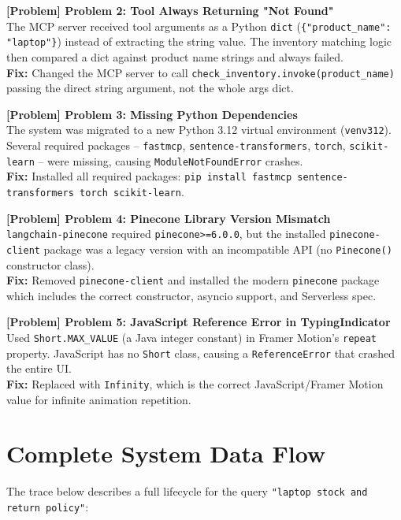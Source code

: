 \documentclass[12pt]{article}
\newcommand{\problembox}[2]{%
  \vspace{6pt}%
  \noindent\colorbox{lightbg}{\parbox{\dimexpr\linewidth-2\fboxsep}{%
    \textbf{\textcolor{accent}{[Problem]} #1}\\[4pt]%
    #2%
  }}\vspace{6pt}%
}
\begin{document}
\problembox{Problem 2: Tool Always Returning "Not Found"}{%
The MCP server received tool arguments as a Python \texttt{dict} (\texttt{\{"product\_name": "laptop"\}}) instead of extracting the string value. The inventory matching logic then compared a dict against product name strings and always failed. \\[4pt]
\textbf{Fix:} Changed the MCP server to call \texttt{check\_inventory.invoke(product\_name)} passing the direct string argument, not the whole args dict.%
}

\problembox{Problem 3: Missing Python Dependencies}{%
The system was migrated to a new Python 3.12 virtual environment (\texttt{venv312}). Several required packages -- \texttt{fastmcp}, \texttt{sentence-transformers}, \texttt{torch}, \texttt{scikit-learn} -- were missing, causing \texttt{ModuleNotFoundError} crashes. \\[4pt]
\textbf{Fix:} Installed all required packages:\vspace{2pt}\newline
\texttt{pip install fastmcp sentence-transformers torch scikit-learn}.%
}

\problembox{Problem 4: Pinecone Library Version Mismatch}{%
\texttt{langchain-pinecone} required \texttt{pinecone>=6.0.0}, but the installed \texttt{pinecone-client} package was a legacy version with an incompatible API (no \texttt{Pinecone()} constructor class). \\[4pt]
\textbf{Fix:} Removed \texttt{pinecone-client} and installed the modern \texttt{pinecone} package which includes the correct constructor, asyncio support, and Serverless spec.%
}

\problembox{Problem 5: JavaScript Reference Error in TypingIndicator}{%
Used \texttt{Short.MAX\_VALUE} (a Java integer constant) in Framer Motion's \texttt{repeat} property. JavaScript has no \texttt{Short} class, causing a \texttt{ReferenceError} that crashed the entire UI. \\[4pt]
\textbf{Fix:} Replaced with \texttt{Infinity}, which is the correct JavaScript/Framer Motion value for infinite animation repetition.%
}

\section{Complete System Data Flow}

The trace below describes a full lifecycle for the query \texttt{"laptop stock and return policy"}:
\end{document}
